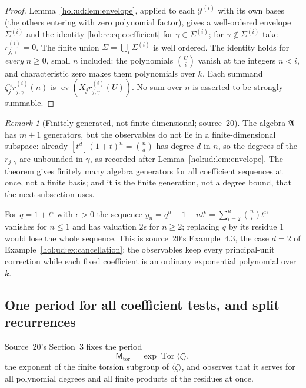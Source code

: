 \documentclass[11pt]{article}
\numberwithin{equation}{section}
\theoremstyle{definition}
\theoremstyle{remark}
\newtheorem{remark}[theorem]{Remark}
\begin{document}
\begin{proof}
Lemma~\ref{hol:ud:lem:envelope}, applied to each $\mathcal Y^{(i)}$ with its
own bases (the others entering with zero polynomial factor), gives a
well-ordered envelope $\Sigma^{(i)}$ and the identity
\eqref{hol:rc:eq:coefficient} for $\gamma\in\Sigma^{(i)}$; for
$\gamma\notin\Sigma^{(i)}$ take $r^{(i)}_{j,\gamma}=0$. The finite union
$\Sigma=\bigcup_i\Sigma^{(i)}$ is well ordered. The identity holds for
\emph{every} $n\ge0$, small $n$ included: the polynomials $\binom Ui$ vanish at
the integers $n<i$, and characteristic zero makes them polynomials over $k$.
Each summand $\zeta_j^nr^{(i)}_{j,\gamma}(n)$ is
$\operatorname{ev}(X_jr^{(i)}_{j,\gamma}(U))$. No sum over $n$ is asserted to
be strongly summable.
\end{proof}

\begin{remark}[Finitely generated, not finite-dimensional; source~20]
\label{hol:rc:rem:degrees}
The algebra $\mathfrak A$ has $m+1$ generators, but the observables do not lie
in a finite-dimensional subspace: already $[t^d](1+t)^n=\binom nd$ has degree
$d$ in $n$, so the degrees of the $r_{j,\gamma}$ are unbounded in $\gamma$, as
recorded after Lemma~\ref{hol:ud:lem:envelope}. The theorem gives finitely
many algebra generators for all coefficient sequences at once, not a finite
basis; and it is the finite generation, not a degree bound, that the next
subsection uses.
\end{remark}

For $q=1+t^\epsilon$ with $\epsilon>0$ the sequence
$y_n=q^n-1-nt^\epsilon=\sum_{i=2}^n\binom nit^{i\epsilon}$ vanishes for
$n\le1$ and has valuation $2\epsilon$ for $n\ge2$; replacing $q$ by its residue
$1$ would lose the whole sequence. This is source~20's Example~4.3, the case
$d=2$ of Example~\ref{hol:ud:ex:cancellation}: the observables keep every
principal-unit correction while each fixed coefficient is an ordinary
exponential polynomial over $k$.

\subsection{One period for all coefficient tests, and split recurrences}
\label{hol:rc:sub:period}

Source~20's Section~3 fixes the period
\begin{equation}\label{hol:rc:eq:torperiod}
 \mathsf M_{\mathrm{tor}}=\exp\operatorname{Tor}\langle\zeta\rangle,
\end{equation}
the exponent of the finite torsion subgroup of $\langle\zeta\rangle$, and
observes that it serves for all polynomial degrees and all finite products of
the residues at once.
\end{document}
